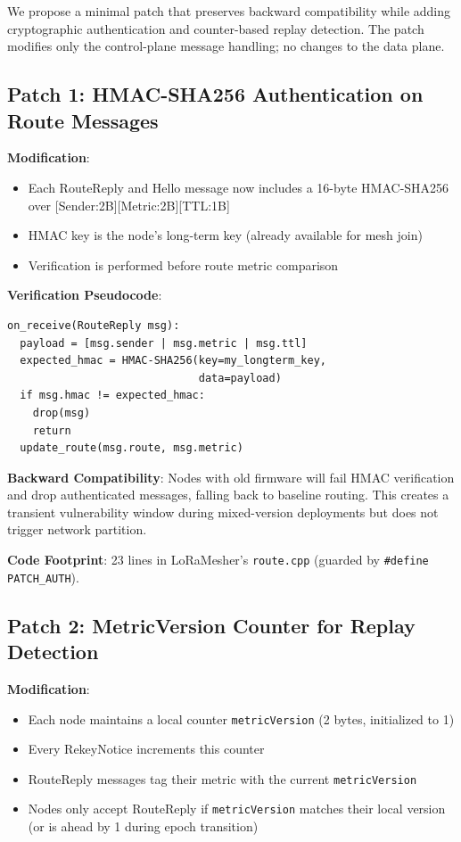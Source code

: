 \documentclass[10pt,journal]{IEEEtran}
\begin{document}
We propose a minimal patch that preserves backward compatibility while adding cryptographic authentication and counter-based replay detection. The patch modifies only the control-plane message handling; no changes to the data plane.

\subsection{Patch 1: HMAC-SHA256 Authentication on Route Messages}

\textbf{Modification}:
\begin{itemize}
	\item Each RouteReply and Hello message now includes a 16-byte HMAC-SHA256 over [Sender:2B][Metric:2B][TTL:1B]
	\item HMAC key is the node's long-term key (already available for mesh join)
	\item Verification is performed before route metric comparison
\end{itemize}

\textbf{Verification Pseudocode}:
\begin{verbatim}
on_receive(RouteReply msg):
  payload = [msg.sender | msg.metric | msg.ttl]
  expected_hmac = HMAC-SHA256(key=my_longterm_key, 
                              data=payload)
  if msg.hmac != expected_hmac:
    drop(msg)
    return
  update_route(msg.route, msg.metric)
\end{verbatim}

\textbf{Backward Compatibility}: Nodes with old firmware will fail HMAC verification and drop authenticated messages, falling back to baseline routing. This creates a transient vulnerability window during mixed-version deployments but does not trigger network partition.

\textbf{Code Footprint}: 23 lines in LoRaMesher's \texttt{route.cpp} (guarded by \texttt{\#define PATCH\_AUTH}).

\subsection{Patch 2: MetricVersion Counter for Replay Detection}

\textbf{Modification}:
\begin{itemize}
	\item Each node maintains a local counter \texttt{metricVersion} (2 bytes, initialized to 1)
	\item Every RekeyNotice increments this counter
	\item RouteReply messages tag their metric with the current \texttt{metricVersion}
	\item Nodes only accept RouteReply if \texttt{metricVersion} matches their local version (or is ahead by 1 during epoch transition)
\end{itemize}
\end{document}
